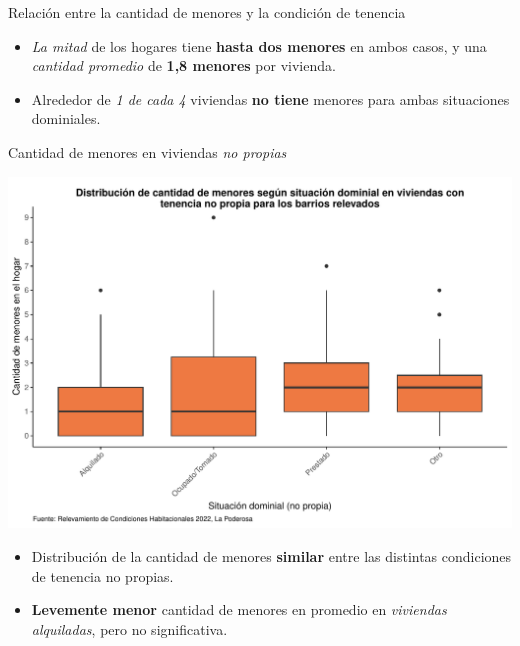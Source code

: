 \documentclass[aspectratio=169]{beamer}
\begin{document}
\begin{frame}{Relación entre la cantidad de menores y la condición de tenencia}
\begin{minipage}{.34\linewidth}
\begin{itemize}
                \item<3-> \textit{La mitad} de los hogares tiene \textbf{\textcolor{yellow!80!black}{hasta dos menores}} en ambos casos, y una \textit{cantidad promedio} de \textbf{1,8 menores} por vivienda.
                
                \item<4-> Alrededor de \textit{1 de cada 4} viviendas \textbf{no tiene} menores para ambas situaciones dominiales.
            \end{itemize}
        \end{minipage}
    \end{frame}

    \begin{frame}{Cantidad de menores en viviendas \textit{no propias}}
        \begin{minipage}{.65\linewidth}
            \begin{overlayarea}{\linewidth}{.75\textheight}
                \includegraphics[height=.75\textheight]{graficas-pdf/boxplot-menores-nopropia-multivariado.pdf}
            \end{overlayarea}
        \end{minipage}
        \begin{minipage}{.34\linewidth}
            \setlength{\leftmargini}{8pt}
            \begin{itemize}
                \item<2-> Distribución de la cantidad de menores \textbf{similar} entre las distintas condiciones de tenencia no propias.

                \item<3-> \textbf{Levemente menor} cantidad de menores en promedio en \textit{viviendas alquiladas}, pero no significativa.
            \end{itemize}
        \end{minipage}
    \end{frame}
\end{document}
